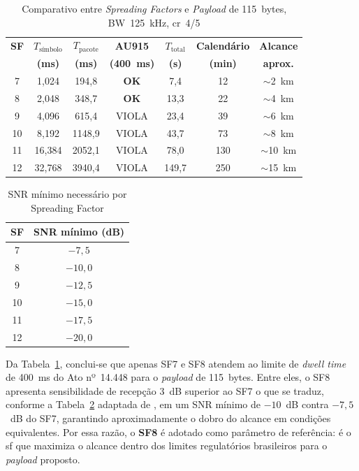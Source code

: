 \begin{table}[htbp]
  \centering
  \caption{Comparativo entre \textit{Spreading Factors} e \textit{Payload} de 115~bytes, BW~125~kHz, \gls{cr}~4/5}
  \label{tab:comparativo_sf}
  \begin{tabular}{ccccccc}
    \toprule
    \textbf{SF} & \textbf{$T_{\text{símbolo}}$} & \textbf{$T_{\text{pacote}}$} & \textbf{AU915} & \textbf{$T_{\text{total}}$} & \textbf{Calendário} & \textbf{Alcance}\\
                & \textbf{(ms)}                 & \textbf{(ms)}                & \textbf{(400~ms)} & \textbf{(s)}             & \textbf{(min)}      & \textbf{aprox.}\\
    \midrule
    7  & 1,024 & 194,8  & \textbf{OK} & 7,4  & 12 & $\sim$2~km \\
    \rowcolor{green!15}
    8  & 2,048 & 348,7  & \textbf{OK} & 13,3 & 22 & $\sim$4~km \\
    9  & 4,096 & 615,4  & VIOLA       & 23,4 & 39 & $\sim$6~km \\
    10 & 8,192 & 1148,9 & VIOLA       & 43,7 & 73 & $\sim$8~km \\
    11 & 16,384 & 2052,1 & VIOLA      & 78,0 & 130 & $\sim$10~km \\
    12 & 32,768 & 3940,4 & VIOLA      & 149,7 & 250 & $\sim$15~km \\
    \bottomrule
  \end{tabular}
\end{table}

\begin{table}[htb]
\centering
\caption{SNR mínimo necessário por Spreading Factor}
\label{tab:snr_sf}
\begin{tabular}{cc}
\toprule
\textbf{SF} & \textbf{SNR mínimo (dB)} \\
\midrule
7  & $-7{,}5$ \\
8  & $-10{,}0$ \\
9  & $-12{,}5$ \\
10 & $-15{,}0$ \\
11 & $-17{,}5$ \\
12 & $-20{,}0$ \\
\bottomrule
\end{tabular}
\end{table}
 
Da Tabela~\ref{tab:comparativo_sf}, conclui-se que apenas SF7 e SF8 atendem ao
limite de \textit{dwell time} de 400~ms do Ato nº~14.448 para o \textit{\gls{payload}} de 115~bytes.
Entre eles, o SF8 apresenta sensibilidade de recepção 3~dB superior ao SF7 o que
se traduz, conforme a Tabela~\ref{tab:snr_sf} adaptada de , em
um SNR mínimo de $-10$~dB contra $-7,5$~dB do SF7, garantindo aproximadamente
o dobro do alcance em condições equivalentes. Por essa razão, o \textbf{SF8} é adotado
como parâmetro de referência: é o \gls{sf} que maximiza o alcance dentro dos limites
regulatórios brasileiros para o \textit{\gls{payload}} proposto.
 

